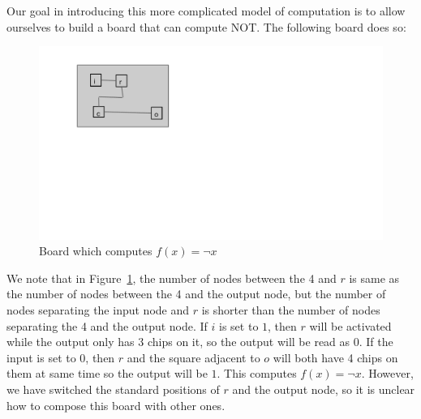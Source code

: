 \documentclass[runningheads,a4paper]{llncs}
\begin{document}







Our goal in introducing this more complicated model of computation is to allow ourselves to build a board that can compute NOT. The following board does so:
\begin{figure}
\centering
\includegraphics[width=0.5\linewidth]{notgate}
\caption{Board which computes $f(x) = \neg x$}
\label{fig:NOT}
\end{figure}

We note that in Figure~\ref{fig:NOT}, the number of nodes between the 4 and $r$ is same as the number of nodes between the 4 and the output node, but the number of nodes separating the input node and $r$ is shorter than the number of nodes separating the 4 and the output node. If $i$ is set to $1$, then $r$ will be activated while the output only has 3 chips on it, so the output will be read as 0. If the input is set to 0, then $r$ and the square adjacent to $o$ will both have 4 chips on them at same time so the output will be $1$. This computes $f(x) = \neg x$. However, we have switched the standard positions of $r$ and the output node, so it is unclear how to compose this board with other ones. 
\end{document}
